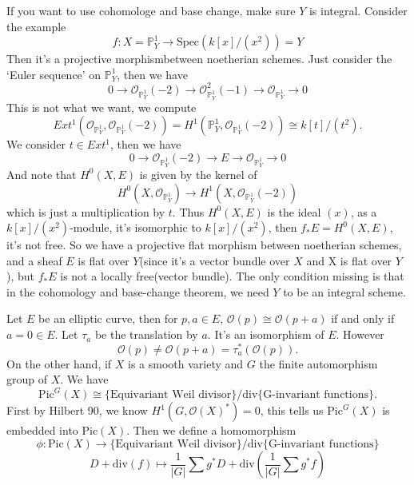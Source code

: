 \documentclass[../main.tex]{subfiles}
\begin{document}
\begin{example}
If you want to use cohomologe and base change, make sure $Y$ is integral. Consider the example
$$f:X=\mathbb{P}^{1}_{Y}\rightarrow \mathrm{Spec}(k[x]/(x^{2}))=Y$$
Then it's a projective morphismbetween noetherian schemes. Just consider the `Euler sequence' on $\mathbb{P}_{Y}^{1}$, then we have 
$$0\rightarrow \mathcal{O}_{\mathbb{P}_{Y}^{1}}(-2)\rightarrow \mathcal{O}^{2}_{\mathbb{P}_{Y}^{1}}(-1)\rightarrow \mathcal{O}_{\mathbb{P}_{Y}^{1}}\rightarrow 0$$
This is not what we want, we compute $$Ext^{1}(\mathcal{O}_{\mathbb{P}_{Y}^{1}},\mathcal{O}_{\mathbb{P}_{Y}^{1}}(-2))=H^{1}(\mathbb{P}_{Y}^{1}, \mathcal{O}_{\mathbb{P}_{Y}^{1}}(-2))\cong k[t]/(t^{2}).$$
We consider $t\in Ext^{1}$, then we have 
$$0\rightarrow \mathcal{O}_{\mathbb{P}_{Y}^{1}}(-2)\rightarrow E \rightarrow \mathcal{O}_{\mathbb{P}_{Y}^{1}}\rightarrow 0$$
And note that $H^{0}(X,E)$ is given by the kernel of 
$$H^{0}(X, \mathcal{O}_{\mathbb{P}_{Y}^{1}})\rightarrow H^{1}(X, \mathcal{O}_{\mathbb{P}_{Y}^{1}}(-2))$$
which is just a multiplication by $t$. Thus $H^{0}(X,E)$ is the ideal $(x)$, as a $k[x]/(x^{2})$-module, it's isomorphic to $k[x]/(x^{2})$, then $f_{*}E=H^{0}(X,E)$, it's not free. So we have a projective flat morphism between noetherian schemes, and a sheaf $E$ is flat over $Y$(since it's a vector bundle over $X$ and X is flat over $Y$), but $f_{*}E$ is not a locally free(vector bundle). The only condition missing is that in the cohomology and base-change theorem, we need $Y$ to be an integral scheme.
\end{example}
\begin{remark}
\end{remark}
\begin{example}
Let $E$ be an elliptic curve, then for $p,a\in E$, $\mathcal{O}(p)\cong \mathcal{O}(p+a)$ if and only if $a= 0\in E$. Let $\tau_{a}$ be the translation by $a$. It's an isomorphism of $E$. However
$$\mathcal{O}(p)\neq \mathcal{O}(p+a)=\tau_{a}^{*}(\mathcal{O}(p)).$$
On the other hand, if $X$ is a smooth variety and $G$ the finite automorphism group of $X$. We have 
$$\mathrm{Pic}^{G}(X)\cong \{\text{Equivariant Weil divisor}\}/\mathrm{div}\{\text{G-invariant functions}\}.$$
First by Hilbert 90, we know $H^{1}(G, \mathcal{O}(X)^{*})=0$, this tells us $\mathrm{Pic}^{G}(X)$ is embedded into $\mathrm{Pic}(X)$. Then we define a homomorphism 
$$\phi: \mathrm{Pic}(X)\rightarrow \{\text{Equivariant Weil divisor}\}/\mathrm{div}\{\text{G-invariant functions}\}$$
$$D+\mathrm{div}(f)\mapsto \frac{1}{|G|}\sum g^{*}D+\mathrm{div}(\frac{1}{|G|}\sum g^{*}f) $$
\end{example}
\end{document}
